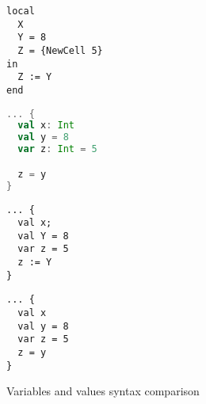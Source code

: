 \begin{figure}
    \noindent\begin{minipage}{.49\textwidth}
    \begin{lstlisting}[title={Oz},language=oz]
local
  X
  Y = 8
  Z = {NewCell 5}
in
  Z := Y
end
    \end{lstlisting}
\end{minipage}
\hfill
    \noindent\begin{minipage}{.49\textwidth}
    \begin{lstlisting}[title={Scala/Ozma},language=scala]
... {
  val x: Int
  val y = 8
  var z: Int = 5

  z = y
}
    \end{lstlisting}
\end{minipage}
    \noindent\begin{minipage}{.49\textwidth}
    \begin{lstlisting}[title={NewOz 2020},language=newoz]
... {
  val x;
  val Y = 8
  var z = 5
  z := Y
}
    \end{lstlisting}
\end{minipage}
\hfill
    \noindent\begin{minipage}{.49\textwidth}
    \begin{lstlisting}[title={NewOz 2021},language=newoz]
... {
  val x
  val y = 8
  var z = 5
  z = y
}
    \end{lstlisting}
\end{minipage}
\caption{Variables and values syntax comparison}
\label{fig:code-comp-var}
\end{figure}

